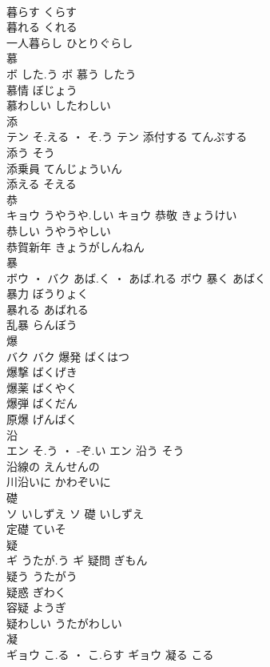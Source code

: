 \documentclass[8pt]{extreport}
\begin{document}
\begin{CJK}{UTF8}{min}
\\	暮らす	くらす	
\\	暮れる	くれる	
\\	一人暮らし	ひとりぐらし	
\\	慕	
\\	ボ	した.う	ボ	慕う	したう	
\\	慕情	ぼじょう	
\\	慕わしい	したわしい	
\\	添	
\\	テン	そ.える ・ そ.う	テン	添付する	てんぷする	
\\	添う	そう	
\\	添乗員	てんじょういん	
\\	添える	そえる	
\\	恭	
\\	キョウ	うやうや.しい	キョウ	恭敬	きょうけい	
\\	恭しい	うやうやしい	
\\	恭賀新年	きょうがしんねん	
\\	暴	
\\	ボウ ・ バク	あば.く ・ あば.れる	ボウ	暴く	あばく	
\\	暴力	ぼうりょく	
\\	暴れる	あばれる	
\\	乱暴	らんぼう	
\\	爆	
\\	バク		バク	爆発	ばくはつ	
\\	爆撃	ばくげき	
\\	爆薬	ばくやく	
\\	爆弾	ばくだん	
\\	原爆	げんばく	
\\	沿	
\\	エン	そ.う ・ -ぞ.い	エン	沿う	そう	
\\	沿線の	えんせんの	
\\	川沿いに	かわぞいに	
\\	礎	
\\	ソ	いしずえ	ソ													礎	いしずえ	
\\	定礎	ていそ	
\\	疑	
\\	ギ	うたが.う	ギ	疑問	ぎもん	
\\	疑う	うたがう	
\\	疑惑	ぎわく	
\\	容疑	ようぎ	
\\	疑わしい	うたがわしい	
\\	凝	
\\	ギョウ	こ.る ・ こ.らす	ギョウ	凝る	こる	

\end{CJK}
\end{document}
